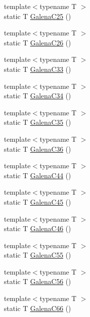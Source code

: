 \begin{DoxyCompactItemize}
\item 
{\footnotesize template$<$typename T $>$ }\\static T \mbox{\hyperlink{namespacempc_1_1data_a3f073a2c2df002f2d161d2783bd45180}{Galena\+C25}} ()
\item 
{\footnotesize template$<$typename T $>$ }\\static T \mbox{\hyperlink{namespacempc_1_1data_aa190de37519c3fff62e793851eb07a06}{Galena\+C26}} ()
\item 
{\footnotesize template$<$typename T $>$ }\\static T \mbox{\hyperlink{namespacempc_1_1data_a4864a297f647e13081c757fe7a9c4de6}{Galena\+C33}} ()
\item 
{\footnotesize template$<$typename T $>$ }\\static T \mbox{\hyperlink{namespacempc_1_1data_a42a32f7c4c113bee87c4c4312eec8a5e}{Galena\+C34}} ()
\item 
{\footnotesize template$<$typename T $>$ }\\static T \mbox{\hyperlink{namespacempc_1_1data_aa9e4d430ac4609bb344cdd3d26c67977}{Galena\+C35}} ()
\item 
{\footnotesize template$<$typename T $>$ }\\static T \mbox{\hyperlink{namespacempc_1_1data_abc226d0d6832eb3e1ff68695afc2424d}{Galena\+C36}} ()
\item 
{\footnotesize template$<$typename T $>$ }\\static T \mbox{\hyperlink{namespacempc_1_1data_a45f2b7c29979ab9ca71bd14b48a7e513}{Galena\+C44}} ()
\item 
{\footnotesize template$<$typename T $>$ }\\static T \mbox{\hyperlink{namespacempc_1_1data_af18bcfee2a34ea14f5128e6afc9f6853}{Galena\+C45}} ()
\item 
{\footnotesize template$<$typename T $>$ }\\static T \mbox{\hyperlink{namespacempc_1_1data_a7b178bd8cd598d73d1100edeb4187df5}{Galena\+C46}} ()
\item 
{\footnotesize template$<$typename T $>$ }\\static T \mbox{\hyperlink{namespacempc_1_1data_af313ace575485953995b2685366462eb}{Galena\+C55}} ()
\item 
{\footnotesize template$<$typename T $>$ }\\static T \mbox{\hyperlink{namespacempc_1_1data_a8e410cbee2b6d0dec211c004233bd7cc}{Galena\+C56}} ()
\item 
{\footnotesize template$<$typename T $>$ }\\static T \mbox{\hyperlink{namespacempc_1_1data_a285c7ca89a0323c93ab6ce51abbd9096}{Galena\+C66}} ()

\end{DoxyCompactItemize}
